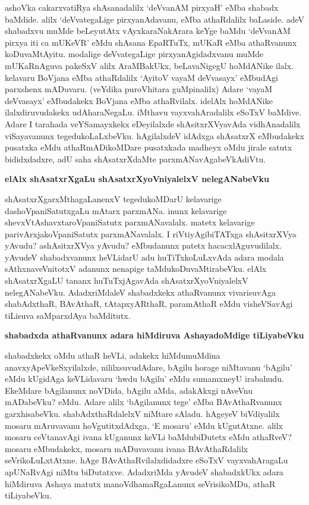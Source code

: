 ashoVka cakarxvatiRya shAsanadalilx `deVvanAM pirxyaH' eMba shabadx baMdide. alilx `deVvategaLige pirxyanAdavanu, eMba athaRdalilx baLaside. adeV shabadxvu muMde beLeyutAtx vAyxkaraNakArara keYge baMdu `deVvanAM pirxya iti ca mUKeVR' eMdu shAsana EpaRTuTx, mUKaR eMba athaRvanunx koDuvaMtAyitu. modalige deVvategaLige pirxyanAgidadxvanu muMde mUKaRnAguva pakeSxV alilx AraMBakUkx, beLavaNigegU hoMdANike ilalx. kelavaru BoVjana eMba athaRdalilx `AyitoV vayaM deVvasayx' eMbudAgi parxshenx mADuvaru. (veYdika puroVhitara guMpinalilx) Adare `vayaM deVvasayx' eMbudakekx BoVjana eMba athaRvilalx. idelAlx hoMdANike ilalxdiruvudakekx udAharaNegaLu. iMthavu vayxvahAradalilx eSoTxV baMdive. Adare I tarahada veYSamayxkekx eDeyilalxde shAsitxrXVyavAda vidhAnadalilx viSayavanunx tegedukoLaLxbeVku. hAgilalxdeV idAdxga shAsatxrX eMbudakekx pusatxka eMdu athaRmADikoMDare pusatxkada madheyx oMdu jirale satutx bididxdadxre, adU saha shAsatxrXdaMte parxmANavAgabeVkAdiVtu.

\noindent
{\bf\large{elAlx shAsatxrXgaLu shAsatxrXyoVniyalelxV nelegANabeVku}}\label{page179}

shAsatxrXgarxMthagaLanenxV tegedukoMDarU kelavarige dashoVpaniSatutxgaLu mAtarx parxmANa. inunx kelavarige shevxVtAshavxtaroVpaniSatutx parxmANavalalx. matetx kelavarige parivArxjakoVpaniSatutx parxmANavalalx. I riVtiyAgibiTATxga shAsitxrXVya yAvudu? ashAsitxrXVya yAvudu? eMbudanunx patetx hacacxlAguvudilalx. yAvudeV shabadxvanunx heVLidarU adu huTiTxkoLuLxvAda adara modala sAthxnaveVnitotxV adanunx nenapige taMdukoDuvaMtirabeVku. elAlx shAsatxrXgaLU tananx huTuTxjAgavAda shAsatxrXyoVniyalelxV nelegANabeVku. AdadxriMdaleV shabadxkekx athaRvanunx vivarisuvAga shabAdxthaR, BAvAthaR, tAtapxyARthaR, paramAthaR eMdu visheVSavAgi tiLisuva saMparxdAya baMditutx.

\noindent
{\bf\large{shabadxda athaRvanunx adara hiMdiruva AshayadoMdige tiLiyabeVku}}\label{page179}

shabadxkekx oMdu athaR heVLi, adakekx hiMdumuMdina anavxyApeVkeSxyilalxde, nililxsuvudAdare, bAgilu horage niMtavanu `bAgilu' eMdu kUgidAga keVLidavaru `hwdu bAgilu' eMdu sumamxneyU irabahudu. EkeMdare bAgilanunx noVDida, bAgilu aMda, adakAkxgi nAveVnu mADabeVku? eMdu. Adare alilx `bAgilanunx tege' eMba BAvAthaRvanunx garxhisabeVku. shabAdxthaRdalelxV niMtare sAladu. hAgeyeV biVdiyalilx mosaru mAruvavanu hoVgutitxdAdxga, `E mosaru' eMdu kUgutAtxne. alilx mosaru ceVtanavAgi ivana kUganunx keVLi baMdubiDutetx eMdu athaRveV? mosaru eMbudakekx, mosaru mADuvavanu ivana BAvAthaRdalilx seVrikoLuLxtAtxne. hAge BAvAthaRvilalxdidadxre eSoTxV vayxvahAragaLu apUNaRvAgi niMtu biDutatxve. AdadxriMda yAvudeV shabadxkUkx adara hiMdiruva Ashaya matutx manoVdhamaRgaLanunx seVrisikoMDu, athaR tiLiyabeVku.


